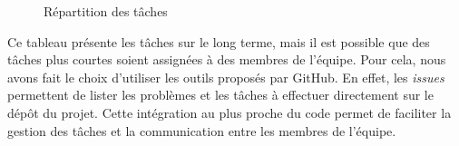 \begin{small}
\begin{figure}[H]
\begin{tabular}{|c|c|c|c|}
        
    \end{tabular}
    \caption{R\'epartition des tâches}
    \label{fig:repartition_des_taches}
\end{figure}
\end{small}


Ce tableau présente les tâches sur le long terme, mais il est possible que des tâches plus courtes soient assignées à des membres de l'équipe.
Pour cela, nous avons fait le choix d'utiliser les outils proposés par GitHub.
En effet, les \textit{issues} permettent de lister les problèmes et les tâches à effectuer directement sur le dépôt du projet.
Cette intégration au plus proche du code permet de faciliter la gestion des tâches et la communication entre les membres de l'équipe.
\\








    








